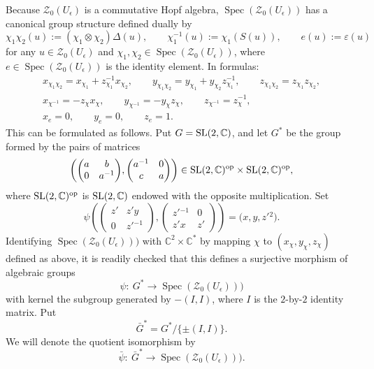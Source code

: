 \documentclass[pdftex]{sigma}%
\numberwithin{equation}{section}
\numberwithin{figure}{section}
\newcommand{\mc}{\mathbb{C}}
\newcommand{\ra}{\rightarrow}
\begin{document}
Because $\mathcal{Z}_0(U_\epsilon)$ is a commutative Hopf algebra, $\operatorname{Spec}(\mathcal{Z}_0(U_\epsilon))$ has a canonical group structure defined dually by
\begin{equation}%
\chi_1\chi_2(u) := (\chi_1\otimes \chi_2)\Delta(u),\qquad
\chi_1^{-1}(u) := \chi_1(S(u)),\qquad
e(u) := \varepsilon(u)
 \end{equation}
for any $u\in \mathcal{Z}_0(U_\epsilon)$ and $\chi_1, \chi_2\in \operatorname{Spec}(\mathcal{Z}_0(U_\epsilon))$, where $e\in \operatorname{Spec}(\mathcal{Z}_0(U_\epsilon))$ is the identity element. In formulas:
\begin{gather*}%
x_{\chi_1\chi_2} = x_{\chi_1}+z_{\chi_1}^{-1}x_{\chi_2},\qquad
y_{\chi_1\chi_2} = y_{\chi_1}+y_{\chi_2}z_{\chi_1}^{-1},\qquad
z_{\chi_1\chi_2} = z_{\chi_1}z_{\chi_2},
\\
x_{\chi^{-1}} =-z_{\chi}x_{\chi},\qquad
y_{\chi^{-1}} = -y_{\chi}z_{\chi},\qquad
z_{\chi^{-1}} = z_{\chi}^{-1},\\
x_e = 0,\qquad y_e = 0,\qquad z_e = 1.
\end{gather*}
This can be formulated as follows. Put $G = {\rm SL}(2,\mc)$, and let %
$G^*$ be the group formed by the pairs of matrices
\[
\left(\begin{pmatrix} a & b \\ 0 & a^{-1}\end{pmatrix}\!, \begin{pmatrix} a^{-1} & 0 \\ c & a \end{pmatrix}\right) \in {\rm SL}(2,\mc)^{\rm op}\times {\rm SL}(2,\mc)^{\rm op},
\]
where ${\rm SL}(2,\mc)^{\rm op}$ is ${\rm SL}(2,\mc)$ endowed with the opposite multiplication. Set
\[
\psi\left( \begin{pmatrix} z' & z'y \\ 0 & z'{}^{-1} \end{pmatrix}\!, \begin{pmatrix} z'{}^{-1} & 0 \\ z'x & z' \end{pmatrix} \right) = \big(x,y,z'{}^2\big).
\]
Identifying $\operatorname{Spec}(\mathcal{Z}_0(U_\epsilon)))$ with $\mc^2\times \mc^*$ by mapping $\chi$ to $(x_\chi,y_\chi,z_\chi)$ defined as above, it is readily checked that this defines a surjective morphism of algebraic groups
\[
\psi\colon\ G^* \ra \operatorname{Spec}(\mathcal{Z}_0(U_\epsilon)))
\]
with kernel the subgroup generated by $-(I, I)$, where $I$ is the $2$-by-$2$ identity matrix. Put
\[
\bar G^* = G^*/\{\pm(I,I)\}.
\]
We will denote the quotient isomorphism by
\[
\bar \psi\colon\ \bar G^* \ra \operatorname{Spec}(\mathcal{Z}_0(U_\epsilon))).
\]
\end{document}
